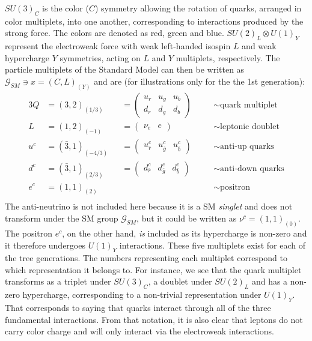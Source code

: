 $SU(3)_C$ is the color ($C$) symmetry allowing the rotation of quarks, arranged in color multiplets, into one another, corresponding to interactions produced by the strong force. The colors are denoted as red, green and blue. $SU (2)_L \otimes U(1)_Y$ represent the electroweak force with weak left-handed isospin $L$ and weak hypercharge $Y$ symmetries, acting on $L$ and $Y$ multiplets, respectively. %
The particle multiplets of the Standard Model can then be written as $\mathcal{G}_{SM} \ni x=(C,L)_{(Y)}$ and are (for illustrations only for the the 1st generation):
\begin{alignat}{3}
  \label{eq:theory:multiplets}
Q &= (3,2)_{(1/3)} &&=
  \begin{pmatrix} 
    u_r & u_g & u_b \\
    d_r & d_g & d_b
    \end{pmatrix} \quad  &&\sim \textrm{quark multiplet} \\[1pt]
L &= (1,2)_{(-1)} &&= \begin{pmatrix} \nu_e & e \end{pmatrix} \quad &&\sim \textrm{leptonic doublet} \\[1pt]
u^c &= (\bar{3},1)_{(-4/3)} &&= \begin{pmatrix} u_{\bar{r}}^c & u_{\bar{g}}^c & u_{\bar{b}}^c\end{pmatrix} \quad &&\sim \textrm{anti-up quarks} \\[1pt]
d^c &= (\bar{3},1)_{(2/3)}  &&= \begin{pmatrix} d_{\bar{r}}^c & d_{\bar{g}}^c & d_{\bar{b}}^c\end{pmatrix} \quad &&\sim \textrm{anti-down quarks} \\[1pt]
e^c &= (1,1)_{(2)}          && \quad &&\sim \textrm{positron} \\
\end{alignat}
The anti-neutrino is not included here because it is a SM \emph{singlet} and does not transform under the SM group $\mathcal{G}_{SM}$, but it could be written as $\nu^c=(1,1)_(0)$. The positron $e^c$, on the other hand, \emph{is} included as its hypercharge is non-zero and it therefore undergoes $U(1)_Y$ interactions. These five multiplets exist for each of the tree generations.\newline
The numbers representing each multiplet correspond to which representation it belongs to. For instance, we see that the quark multiplet transforms as a triplet under $SU(3)_C$, a doublet under $SU(2)_L$ and has a non-zero hypercharge, corresponding to a non-trivial representation under $U(1)_Y$. That corresponds to saying that quarks interact through all of the three fundamental interactions. From that notation, it is also clear that leptons do not carry color charge and will only interact via the electroweak interactions.\newline
